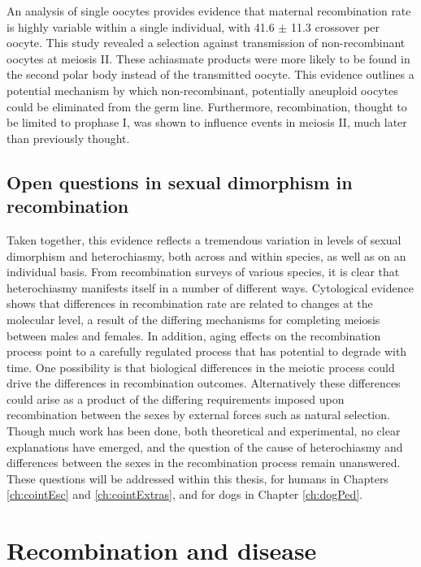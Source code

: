 An analysis of single oocytes provides evidence that maternal recombination rate is highly variable within a single individual, with 41.6 $\pm$ 11.3 crossover per oocyte\cite{Ottolini2015}.
This study revealed a selection against transmission of non-recombinant oocytes at meiosis II.
These achiasmate products were more likely to be found in the second polar body instead of the transmitted oocyte.
This evidence outlines a potential mechanism by which non-recombinant, potentially aneuploid oocytes could be eliminated from the germ line.
Furthermore, recombination, thought to be limited to prophase I, was shown to influence events in meiosis II, much later than previously thought.

\subsection{Open questions in sexual dimorphism in recombination}
Taken together, this evidence reflects a tremendous variation in levels of sexual dimorphism and heterochiasmy, both across and within species, as well as on an individual basis.
From recombination surveys of various species, it is clear that heterochiasmy manifests itself in a number of different ways.
Cytological evidence shows that differences in recombination rate are related to changes at the molecular level, a result of the differing mechanisms for completing meiosis between males and females.
In addition, aging effects on the recombination process point to a carefully regulated process that has potential to degrade with time.
One possibility is that biological differences in the meiotic process could drive the differences in recombination outcomes.
Alternatively these differences could arise as a product of the differing requirements imposed upon recombination between the sexes by external forces such as natural selection.
Though much work has been done, both theoretical and experimental, no clear explanations have emerged, and the question of the cause of heterochiasmy and differences between the sexes in the recombination process remain unanswered.
These questions will be addressed within this thesis, for humans in Chapters \ref{ch:cointEsc} and \ref{ch:cointExtras}, and for dogs in Chapter \ref{ch:dogPed}.




\section{Recombination and disease}

